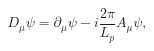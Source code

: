 \begin{equation}
D_\mu \psi =\partial _\mu \psi -i\frac{2\pi }{L_p}A_\mu \psi ,
\label{quintcovder}
\end{equation}

